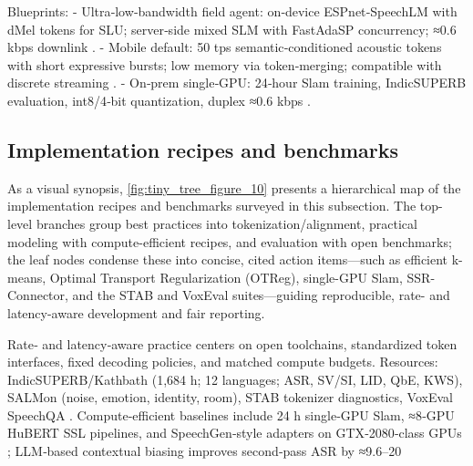 Blueprints:
- Ultra‑low‑bandwidth field agent: on‑device ESPnet‑SpeechLM with dMel tokens for SLU; server‑side mixed SLM with FastAdaSP concurrency; ≈0.6 kbps downlink \cite{bai2025dmelspeechtokenizationmadesimple,tian2025espnetspeechlmopenspeechlanguagemodeltoo,entry2025indicsuperbspeechprocessinguniversalperf,lu2024fastadaspmultitaskadaptedefficientinfere}.
- Mobile default: 50 tps semantic‑conditioned acoustic tokens with short expressive bursts; low memory via token‑merging; compatible with discrete streaming \cite{mousavi2024dasbdiscreteaudiospeechbenchmark,yang2025diffsoundstreamefficientspeechtokenizati,lu2024fastadaspmultitaskadaptedefficientinfere,zhao2024textlessstreamingspeechtranslationsemant}.
- On‑prem single‑GPU: 24‑hour Slam training, IndicSUPERB evaluation, int8/4‑bit quantization, duplex ≈0.6 kbps \cite{maimon2025slammingtrainingspeechlanguagemodelonegp,entry2025indicsuperbspeechprocessinguniversalperf,dao2025ichigomixedmodalearlyfusionrealtimevoice}.

\subsection{Implementation recipes and benchmarks} \label{subsec:Implementation recipes and benchmarks}
As a visual synopsis, \autoref{fig:tiny_tree_figure_10} presents a hierarchical map of the implementation recipes and benchmarks surveyed in this subsection. The top-level branches group best practices into tokenization/alignment, practical modeling with compute-efficient recipes, and evaluation with open benchmarks; the leaf nodes condense these into concise, cited action items—such as efficient k-means, Optimal Transport Regularization (OTReg), single-GPU Slam, SSR-Connector, and the STAB and VoxEval suites—guiding reproducible, rate- and latency-aware development and fair reporting.

Rate‑ and latency‑aware practice centers on open toolchains, standardized token interfaces, fixed decoding policies, and matched compute budgets. Resources: IndicSUPERB/Kathbath (1,684 h; 12 languages; ASR, SV/SI, LID, QbE, KWS), SALMon (noise, emotion, identity, room), STAB tokenizer diagnostics, VoxEval SpeechQA \cite{entry2025indicsuperbspeechprocessinguniversalperf,maimon2025salmonsuiteacousticlanguagemodelevaluati,vashishth2024stabspeechtokenizerassessmentbenchmark,cui2025voxevalbenchmarkingknowledgeunderstandin}. Compute‑efficient baselines include 24 h single‑GPU Slam, ≈8‑GPU HuBERT SSL pipelines, and SpeechGen‑style adapters on GTX‑2080‑class GPUs \cite{maimon2025slammingtrainingspeechlanguagemodelonegp,chen2023reducingbarriersselfsupervisedlearninghu,wu2023speechgenunlockinggenerativepowerspeechl}; LLM‑based contextual biasing improves second‑pass ASR by ≈9.6–20%

